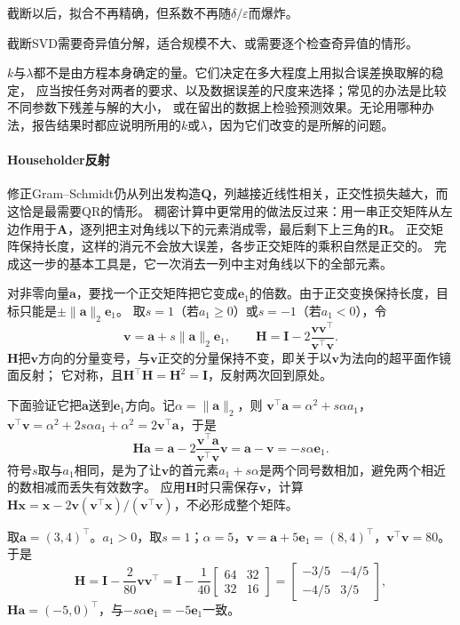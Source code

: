 截断以后，拟合不再精确，但系数不再随$\delta/\varepsilon$而爆炸。

截断SVD需要奇异值分解，适合规模不大、或需要逐个检查奇异值的情形。

$k$与$\lambda$都不是由方程本身确定的量。它们决定在多大程度上用拟合误差换取解的稳定，
应当按任务对两者的要求、以及数据误差的尺度来选择；常见的办法是比较不同参数下残差与解的大小，
或在留出的数据上检验预测效果。无论用哪种办法，报告结果时都应说明所用的$k$或$\lambda$，因为它们改变的是所解的问题。

\paragraph{Householder反射}
\label{sec:ls-orthogonalization-qr}

修正Gram--Schmidt仍从列出发构造$\bm Q$，列越接近线性相关，正交性损失越大，而这恰是最需要QR的情形。
稠密计算中更常用的做法反过来：用一串正交矩阵从左边作用于$\bm A$，逐列把主对角线以下的元素消成零，最后剩下上三角的$\bm R$。
正交矩阵保持长度，这样的消元不会放大误差，各步正交矩阵的乘积自然是正交的。
完成这一步的基本工具是，它一次消去一列中主对角线以下的全部元素。

对非零向量$\bm a$，要找一个正交矩阵把它变成$\bm e_1$的倍数。由于正交变换保持长度，目标只能是$\pm\lVert\bm a\rVert_2\bm e_1$。
取$s=1$（若$a_1\geq0$）或$s=-1$（若$a_1<0$），令
\begin{equation}
 \bm v=\bm a+s\lVert\bm a\rVert_2\bm e_1,\qquad
 \bm H=\bm I-2\frac{\bm v\bm v^\top}{\bm v^\top\bm v}.
 \label{eq:ls-householder}
\end{equation}
$\bm H$把$\bm v$方向的分量变号，与$\bm v$正交的分量保持不变，即关于以$\bm v$为法向的超平面作镜面反射；
它对称，且$\bm H^\top\bm H=\bm H^2=\bm I$，反射两次回到原处。

下面验证它把$\bm a$送到$\bm e_1$方向。记$\alpha=\lVert\bm a\rVert_2$，则
$\bm v^\top\bm a=\alpha^2+s\alpha a_1$，$\bm v^\top\bm v=\alpha^2+2s\alpha a_1+\alpha^2=2\bm v^\top\bm a$，于是
\[
 \bm H\bm a=\bm a-2\frac{\bm v^\top\bm a}{\bm v^\top\bm v}\bm v=\bm a-\bm v=-s\alpha\bm e_1 .
\]
符号$s$取与$a_1$相同，是为了让$\bm v$的首元素$a_1+s\alpha$是两个同号数相加，避免两个相近的数相减而丢失有效数字。
应用$\bm H$时只需保存$\bm v$，计算$\bm H\bm x=\bm x-2\bm v(\bm v^\top\bm x)/(\bm v^\top\bm v)$，不必形成整个矩阵。

\begin{example}[二维向量的Householder反射]
\label{ex:ls-householder-two-dim}
取$\bm a=(3,4)^\top$。$a_1>0$，取$s=1$；$\alpha=5$，$\bm v=\bm a+5\bm e_1=(8,4)^\top$，$\bm v^\top\bm v=80$。于是
\[
 \bm H=\bm I-\frac{2}{80}\bm v\bm v^\top
 =\bm I-\frac1{40}\begin{bmatrix}64&32\\32&16\end{bmatrix}
 =\begin{bmatrix}-3/5&-4/5\\-4/5&3/5\end{bmatrix},
\]
$\bm H\bm a=(-5,0)^\top$，与$-s\alpha\bm e_1=-5\bm e_1$一致。
\end{example}

